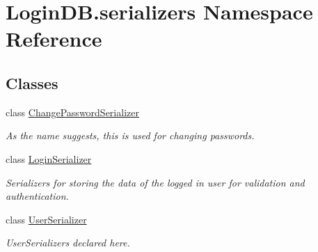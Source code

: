\hypertarget{namespace_login_d_b_1_1serializers}{}\section{Login\+D\+B.\+serializers Namespace Reference}
\label{namespace_login_d_b_1_1serializers}
\subsection*{Classes}
\begin{DoxyCompactItemize}
\item 
class \hyperlink{class_login_d_b_1_1serializers_1_1_change_password_serializer}{Change\+Password\+Serializer}
\begin{DoxyCompactList}\small\item\em As the name suggests, this is used for changing passwords. \end{DoxyCompactList}\item 
class \hyperlink{class_login_d_b_1_1serializers_1_1_login_serializer}{Login\+Serializer}
\begin{DoxyCompactList}\small\item\em Serializers for storing the data of the logged in user for validation and authentication. \end{DoxyCompactList}\item 
class \hyperlink{class_login_d_b_1_1serializers_1_1_user_serializer}{User\+Serializer}
\begin{DoxyCompactList}\small\item\em User\+Serializers declared here. \end{DoxyCompactList}\end{DoxyCompactItemize}
